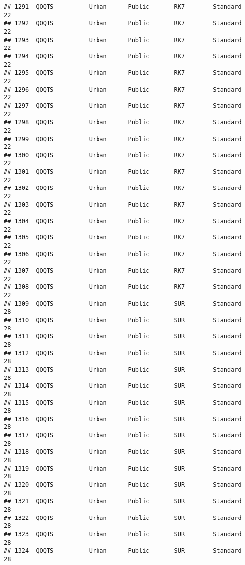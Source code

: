 \documentclass[
]{article}
\begin{document}
\begin{verbatim}
## 1291  QOQTS          Urban      Public       RK7        Standard        22
## 1292  QOQTS          Urban      Public       RK7        Standard        22
## 1293  QOQTS          Urban      Public       RK7        Standard        22
## 1294  QOQTS          Urban      Public       RK7        Standard        22
## 1295  QOQTS          Urban      Public       RK7        Standard        22
## 1296  QOQTS          Urban      Public       RK7        Standard        22
## 1297  QOQTS          Urban      Public       RK7        Standard        22
## 1298  QOQTS          Urban      Public       RK7        Standard        22
## 1299  QOQTS          Urban      Public       RK7        Standard        22
## 1300  QOQTS          Urban      Public       RK7        Standard        22
## 1301  QOQTS          Urban      Public       RK7        Standard        22
## 1302  QOQTS          Urban      Public       RK7        Standard        22
## 1303  QOQTS          Urban      Public       RK7        Standard        22
## 1304  QOQTS          Urban      Public       RK7        Standard        22
## 1305  QOQTS          Urban      Public       RK7        Standard        22
## 1306  QOQTS          Urban      Public       RK7        Standard        22
## 1307  QOQTS          Urban      Public       RK7        Standard        22
## 1308  QOQTS          Urban      Public       RK7        Standard        22
## 1309  QOQTS          Urban      Public       SUR        Standard        28
## 1310  QOQTS          Urban      Public       SUR        Standard        28
## 1311  QOQTS          Urban      Public       SUR        Standard        28
## 1312  QOQTS          Urban      Public       SUR        Standard        28
## 1313  QOQTS          Urban      Public       SUR        Standard        28
## 1314  QOQTS          Urban      Public       SUR        Standard        28
## 1315  QOQTS          Urban      Public       SUR        Standard        28
## 1316  QOQTS          Urban      Public       SUR        Standard        28
## 1317  QOQTS          Urban      Public       SUR        Standard        28
## 1318  QOQTS          Urban      Public       SUR        Standard        28
## 1319  QOQTS          Urban      Public       SUR        Standard        28
## 1320  QOQTS          Urban      Public       SUR        Standard        28
## 1321  QOQTS          Urban      Public       SUR        Standard        28
## 1322  QOQTS          Urban      Public       SUR        Standard        28
## 1323  QOQTS          Urban      Public       SUR        Standard        28
## 1324  QOQTS          Urban      Public       SUR        Standard        28

\end{verbatim}
\end{document}
